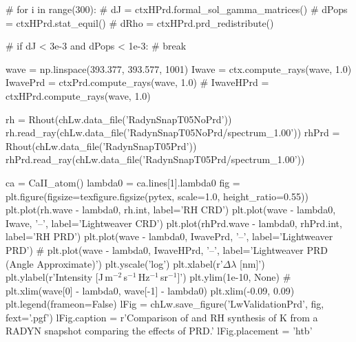 \begin{pycode}[Lw]
# for i in range(300):
#     dJ = ctxHPrd.formal_sol_gamma_matrices()
#     dPops = ctxHPrd.stat_equil()
#     dRho = ctxHPrd.prd_redistribute()

#     if dJ < 3e-3 and dPops < 1e-3:
#         break

wave = np.linspace(393.377, 393.577, 1001)
Iwave = ctx.compute_rays(wave, 1.0)
IwavePrd = ctxPrd.compute_rays(wave, 1.0)
# IwaveHPrd = ctxHPrd.compute_rays(wave, 1.0)

rh = Rhout(chLw.data_file('RadynSnapT05NoPrd'))
rh.read_ray(chLw.data_file('RadynSnapT05NoPrd/spectrum_1.00'))
rhPrd = Rhout(chLw.data_file('RadynSnapT05Prd'))
rhPrd.read_ray(chLw.data_file('RadynSnapT05Prd/spectrum_1.00'))

ca = CaII_atom()
lambda0 = ca.lines[1].lambda0
fig = plt.figure(figsize=texfigure.figsize(pytex, scale=1.0, height_ratio=0.55))
plt.plot(rh.wave - lambda0, rh.int, label='RH CRD')
plt.plot(wave - lambda0, Iwave, '--', label='Lightweaver CRD')
plt.plot(rhPrd.wave - lambda0, rhPrd.int, label='RH PRD')
plt.plot(wave - lambda0, IwavePrd, '--', label='Lightweaver PRD')
# plt.plot(wave - lambda0, IwaveHPrd, '--', label='Lightweaver PRD (Angle Approximate)')
plt.yscale('log')
plt.xlabel(r'$\Delta\lambda$ [nm]')
plt.ylabel(r'Intensity [J\,m$^{-2}$\,s$^{-1}$\,Hz$^{-1}$\,sr$^{-1}$]')
plt.ylim(1e-10, None)
# plt.xlim(wave[0] - lambda0, wave[-1] - lambda0)
plt.xlim(-0.09, 0.09)
plt.legend(frameon=False)
lFig = chLw.save_figure('LwValidationPrd', fig, fext='.pgf')
lFig.caption = r'Comparison of \Lw{} and RH synthesis of \Caii{} K from a RADYN snapshot comparing the effects of PRD.'
lFig.placement = 'htb'
\end{pycode}
